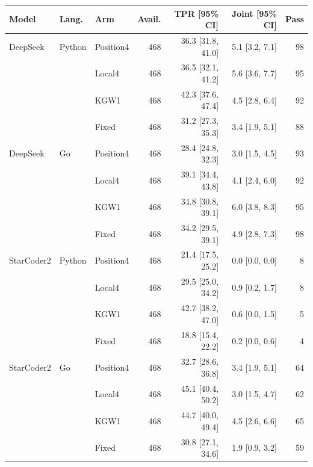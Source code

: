 \begin{tabular}{lllrrrr}
\toprule
Model & Lang. & Arm & Avail. & TPR [95\% CI] & Joint [95\% CI] & Pass \\
\midrule
DeepSeek & Python & Position4 & 468 & 36.3 [31.8, 41.0] & 5.1 [3.2, 7.1] & 98 \\
 &  & Local4 & 468 & 36.5 [32.1, 41.2] & 5.6 [3.6, 7.7] & 95 \\
 &  & KGW1 & 468 & 42.3 [37.6, 47.4] & 4.5 [2.8, 6.4] & 92 \\
 &  & Fixed & 468 & 31.2 [27.3, 35.3] & 3.4 [1.9, 5.1] & 88 \\
DeepSeek & Go & Position4 & 468 & 28.4 [24.8, 32.3] & 3.0 [1.5, 4.5] & 93 \\
 &  & Local4 & 468 & 39.1 [34.4, 43.8] & 4.1 [2.4, 6.0] & 92 \\
 &  & KGW1 & 468 & 34.8 [30.8, 39.1] & 6.0 [3.8, 8.3] & 95 \\
 &  & Fixed & 468 & 34.2 [29.5, 39.1] & 4.9 [2.8, 7.3] & 98 \\
StarCoder2 & Python & Position4 & 468 & 21.4 [17.5, 25.2] & 0.0 [0.0, 0.0] & 8 \\
 &  & Local4 & 468 & 29.5 [25.0, 34.2] & 0.9 [0.2, 1.7] & 8 \\
 &  & KGW1 & 468 & 42.7 [38.2, 47.0] & 0.6 [0.0, 1.5] & 5 \\
 &  & Fixed & 468 & 18.8 [15.4, 22.2] & 0.2 [0.0, 0.6] & 4 \\
StarCoder2 & Go & Position4 & 468 & 32.7 [28.6, 36.8] & 3.4 [1.9, 5.1] & 64 \\
 &  & Local4 & 468 & 45.1 [40.4, 50.2] & 3.0 [1.5, 4.7] & 62 \\
 &  & KGW1 & 468 & 44.7 [40.0, 49.4] & 4.5 [2.6, 6.6] & 65 \\
 &  & Fixed & 468 & 30.8 [27.1, 34.6] & 1.9 [0.9, 3.2] & 59 \\
\bottomrule
\end{tabular}
